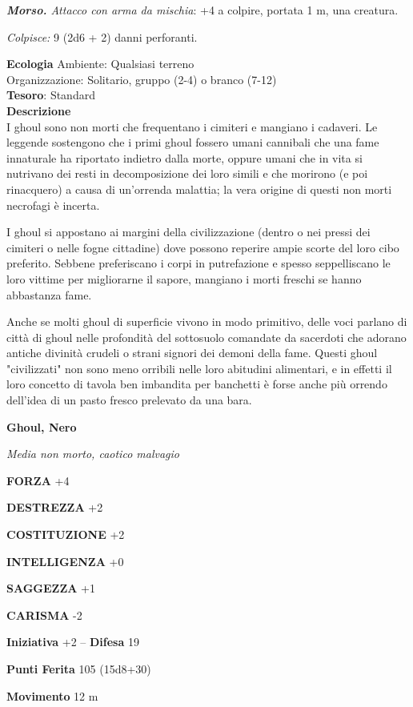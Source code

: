 \begin{multicols}{2}
\textit{\textbf{Morso.} Attacco con arma da mischia}: +4 a colpire, portata 1 m, una creatura.

\textit{Colpisce:} 9 (2d6 + 2) danni perforanti.

\textbf{Ecologia}
Ambiente: Qualsiasi terreno\\
Organizzazione: Solitario, gruppo (2-4) o branco (7-12)\\
\textbf{Tesoro}: Standard\\
\textbf{Descrizione}\\
I ghoul sono non morti che frequentano i cimiteri e mangiano i cadaveri. Le leggende sostengono che i primi ghoul fossero umani cannibali che una fame innaturale ha riportato indietro dalla morte, oppure umani che in vita si nutrivano dei resti in decomposizione dei loro simili e che morirono (e poi rinacquero) a causa di un'orrenda malattia; la vera origine di questi non morti necrofagi è incerta.

I ghoul si appostano ai margini della civilizzazione (dentro o nei pressi dei cimiteri o nelle fogne cittadine) dove possono reperire ampie scorte del loro cibo preferito. Sebbene preferiscano i corpi in putrefazione e spesso seppelliscano le loro vittime per migliorarne il sapore, mangiano i morti freschi se hanno abbastanza fame.


Anche se molti ghoul di superficie vivono in modo primitivo, delle voci parlano di città di ghoul nelle profondità del sottosuolo comandate da sacerdoti che adorano antiche divinità crudeli o strani signori dei demoni della fame. Questi ghoul "civilizzati" non sono meno orribili nelle loro abitudini alimentari, e in effetti il loro concetto di tavola ben imbandita per banchetti è forse anche più orrendo dell'idea di un pasto fresco prelevato da una bara.

\medskip{}\textbf{Ghoul, Nero}

\textit{Media non morto, caotico malvagio}

\textbf{FORZA} +4

\textbf{DESTREZZA} +2

\textbf{COSTITUZIONE} +2

\textbf{INTELLIGENZA} +0

\textbf{SAGGEZZA} +1

\textbf{CARISMA} -2

\textbf{Iniziativa} +2 -- \textbf{Difesa} 19

\textbf{Punti Ferita} 105 (15d8+30)

\textbf{Movimento} 12 m


\end{multicols}
